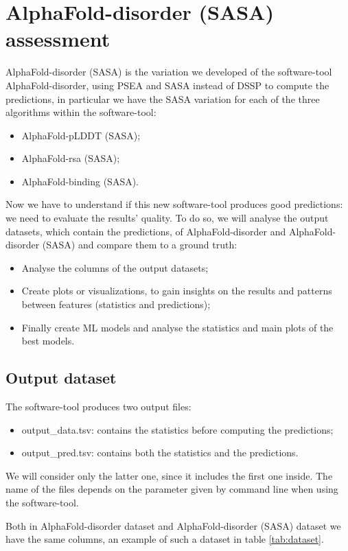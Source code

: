 \chapter{AlphaFold-disorder (SASA) assessment}
\label{chp:analysis}
AlphaFold-disorder (SASA) is the variation we developed of the software-tool AlphaFold-disorder, using PSEA and SASA instead of DSSP to compute the predictions, in particular we have the SASA variation for each of the three algorithms within the software-tool:
\begin{itemize}
    \item AlphaFold-pLDDT (SASA);
    \item AlphaFold-rsa (SASA);
    \item AlphaFold-binding (SASA).
\end{itemize}

Now we have to understand if this new software-tool produces good predictions: we need to evaluate the results' quality. To do so, we will analyse the output datasets, which contain the predictions, of AlphaFold-disorder and AlphaFold-disorder (SASA) and compare them to a ground truth:
\begin{itemize}
    \item Analyse the columns of the output datasets;
    \item Create plots or visualizations, to gain insights on the results and patterns between features (statistics and predictions);
    \item Finally create ML models and analyse the statistics and main plots of the best models.
\end{itemize}

\section{Output dataset}
The software-tool produces two output files:
\begin{itemize}
    \item output\_data.tsv: contains the statistics before computing the predictions;
    \item output\_pred.tsv: contains both the statistics and the predictions.
\end{itemize}
We will consider only the latter one, since it includes the first one inside. The name of the files depends on the parameter given by command line when using the software-tool. 

Both in AlphaFold-disorder dataset and AlphaFold-disorder (SASA) dataset we have the same columns, an example of such a dataset in table \ref{tab:dataset}.


